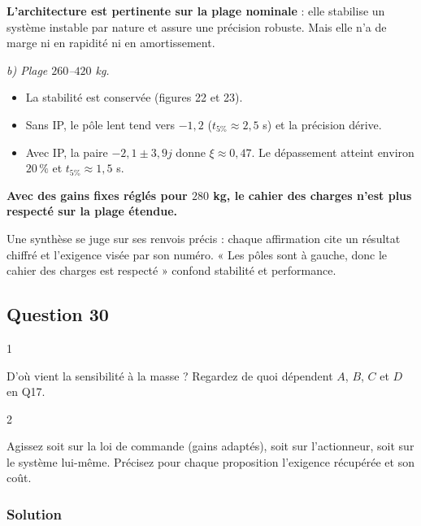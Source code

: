\documentclass[11pt,a4paper]{article}
\providecommand{\tightlist}{\setlength{\itemsep}{0pt}\setlength{\parskip}{0pt}}
\begin{document}
\textbf{L'architecture est pertinente sur la plage nominale} : elle stabilise un système instable par nature et assure une précision robuste. Mais elle n'a de marge ni en rapidité ni en amortissement.

\emph{b) Plage \(260\)--\(420\) kg.}

\begin{itemize}
\tightlist
\item
  La stabilité est conservée (figures 22 et 23).
\item
  Sans IP, le pôle lent tend vers \(-1{,}2\) (\(t_{5\%}\approx2{,}5\) s) et la précision dérive.
\item
  Avec IP, la paire \(-2{,}1\pm3{,}9j\) donne \(\xi\approx0{,}47\). Le dépassement atteint environ \(20\,\%\) et \(t_{5\%}\approx1{,}5\) s.
\end{itemize}

\textbf{Avec des gains fixes réglés pour \(280\) kg, le cahier des charges n'est plus respecté sur la plage étendue.}

\begin{jury}

Une synthèse se juge sur ses renvois précis : chaque affirmation cite un résultat chiffré et l'exigence visée par son numéro. « Les pôles sont à gauche, donc le cahier des charges est respecté » confond stabilité et performance.

\end{jury}

\hypertarget{question-30}{%
\subsection{Question 30}\label{question-30}}

\begin{indication}{1}

D'où vient la sensibilité à la masse ? Regardez de quoi dépendent \(A\), \(B\), \(C\) et \(D\) en Q17.

\end{indication}

\begin{indication}{2}

Agissez soit sur la loi de commande (gains adaptés), soit sur l'actionneur, soit sur le système lui-même. Précisez pour chaque proposition l'exigence récupérée et son coût.

\end{indication}

\hypertarget{solution-29}{%
\subsubsection{Solution}\label{solution-29}}
\end{document}
